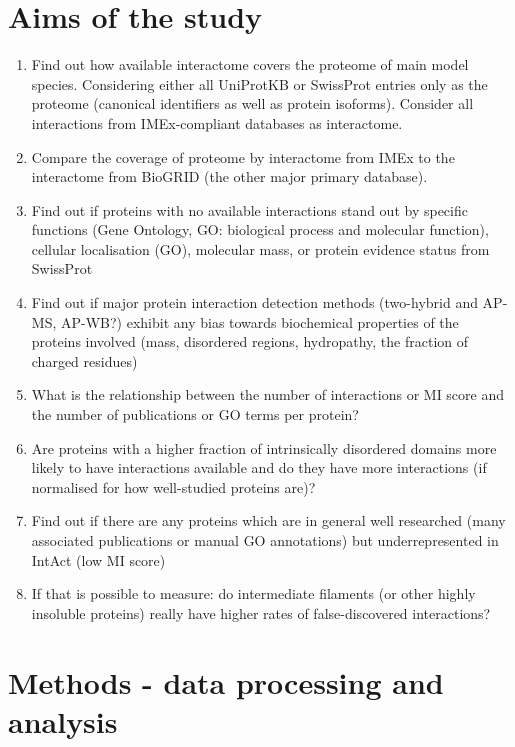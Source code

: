 \documentclass[]{article}
\begin{document}
\section{Aims of the study}\label{aims-of-the-study}

\begin{enumerate}
\def\labelenumi{\arabic{enumi}.}
\item
  Find out how available interactome covers the proteome of main model
  species. Considering either all UniProtKB or SwissProt entries only as
  the proteome (canonical identifiers as well as protein isoforms).
  Consider all interactions from IMEx-compliant databases as
  interactome.
\item
  Compare the coverage of proteome by interactome from IMEx to the
  interactome from BioGRID (the other major primary database).
\item
  Find out if proteins with no available interactions stand out by
  specific functions (Gene Ontology, GO: biological process and
  molecular function), cellular localisation (GO), molecular mass, or
  protein evidence status from SwissProt
\item
  Find out if major protein interaction detection methods (two-hybrid
  and AP-MS, AP-WB?) exhibit any bias towards biochemical properties of
  the proteins involved (mass, disordered regions, hydropathy, the
  fraction of charged residues)
\item
  What is the relationship between the number of interactions or MI
  score and the number of publications or GO terms per protein?
\item
  Are proteins with a higher fraction of intrinsically disordered
  domains more likely to have interactions available and do they have
  more interactions (if normalised for how well-studied proteins are)?
\item
  Find out if there are any proteins which are in general well
  researched (many associated publications or manual GO annotations) but
  underrepresented in IntAct (low MI score)
\item
  If that is possible to measure: do intermediate filaments (or other
  highly insoluble proteins) really have higher rates of
  false-discovered interactions?
\end{enumerate}

\section{Methods - data processing and
analysis}\label{methods---data-processing-and-analysis}
\end{document}
